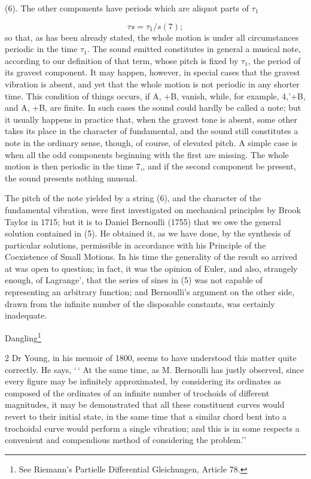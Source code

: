 (6). The other components have periods which are aliquot parts of \(\tau_1\)

\[\tau s = \tau_1 / s  (7);\]
so that, as has been already stated, the whole
motion is under all circumstances periodic in the time \(\tau_1.\) The sound
emitted constitutes in general a musical note, according to our definition of
that term, whose pitch is fixed by \(\tau_1\), the period of its gravest
component. It may happen, however, in special cases that the gravest vibration
is absent, and yet that the whole motion is not periodic in any shorter time.
This condition of things occurs, if A, +B, vanish, while, for example, 4,'+B,
and A, +B, are finite. In such cases the sound could hardly be called a note;
but it usually happens in practice that, when the gravest tone is absent, some
other takes its place in the character of fundamental, and the sound still
constitutes a note in the ordinary sense, though, of course, of elevated pitch.
A simple case is when all the odd components beginning with the first are
missing. The whole motion is then periodic in the time 7,, and if the second
component be present, the sound presents nothing unusual.

The pitch of the note yielded by a string (6), and the character of the
fundamental vibration, were first investigated on mechanical principles by
Brook Taylor in 1715; but it is to Daniel Bernoulli (1755) that we owe the
general solution contained in (5). He obtained it, as we have done, by the
synthesis of particular solutions, permissible in accordance with his Principle
of the Coexistence of Small Motions. In his time the generality of the result
so arrived at was open to question; in fact, it was the opinion of Euler, and
also, strangely enough, of Lagrange', that the series of sines in (5) was not
capable of representing an arbitrary function; and Bernoulli's argument on the
other side, drawn from the infinite number of the disposable constants, was
certainly inadequate.

Dangling\footnote{ See Riemann's Partielle Differential Gleichungen, Article 78.}

2 Dr Young, in his memoir of 1800, seems to have understood this matter quite
correctly. He says, `\,` At the same time, as M. Bernoulli has justly observed,
since every figure may be infinitely approximated, by considering its ordinates
as composed of the ordinates of an infinite number of trochoids of different
magnitudes, it may be demonstrated that all these constituent curves would
revert to their initial state, in the same time that a similar chord bent into
a trochoidal curve would perform a single vibration; and this is in some
respects a convenient and compendious method of considering the problem.''

